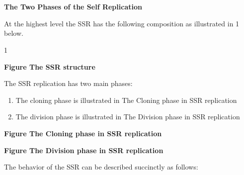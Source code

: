 \section[]{\color{black} }

\bigskip

{\bfseries
\hypertarget{RefHeading3044306210128}{}The Two Phases of the Self
Replication}

At the highest level the SSR has the following composition as
illustrated in 1 below.

 1

{\bfseries
\label{bkm:Ref331099850}Figure  The SSR structure}


\bigskip

The SSR replication has two main phases:

\begin{enumerate}
\item The cloning phase is illustrated in  The Cloning phase in SSR
replication
\item The division phase is illustrated in  The Division phase in SSR
replication
\end{enumerate}

\bigskip

{\bfseries
\label{bkm:Ref329890094}Figure  The Cloning phase in SSR replication}


\bigskip


\bigskip

{\bfseries
\label{bkm:Ref329890734}Figure  The Division phase in SSR replication}


\bigskip

The behavior of the SSR can be described succinctly as follows:

